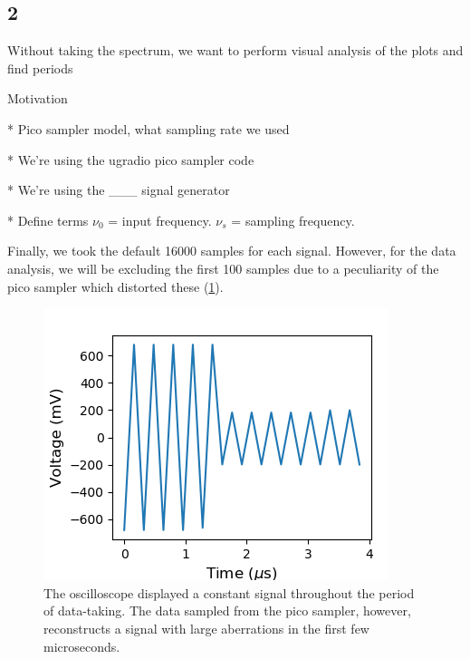 \documentclass[a4paper]{article}
\begin{document}
\subsection{2}

Without taking the spectrum, we want to perform visual analysis of the plots and find periods

Motivation

* Pico sampler model, what sampling rate we used

* We're using the ugradio pico sampler code

* We're using the \_\_\_ signal generator

* Define terms $\nu_0$ = input frequency. $\nu_s$ = sampling frequency.

Finally, we took the default 16000 samples for each signal. However, for the data analysis, we will be excluding the first 100 samples due to a peculiarity of the pico sampler which distorted these (\ref{fig:pico_start}).


\begin{figure}
\centering
\includegraphics{5-2/pico_bad} %
\caption{\label{fig:pico_start}The oscilloscope displayed a constant signal throughout the period of data-taking. The data sampled from the pico sampler, however, reconstructs a signal with large aberrations in the first few microseconds.}
\end{figure}
\end{document}
